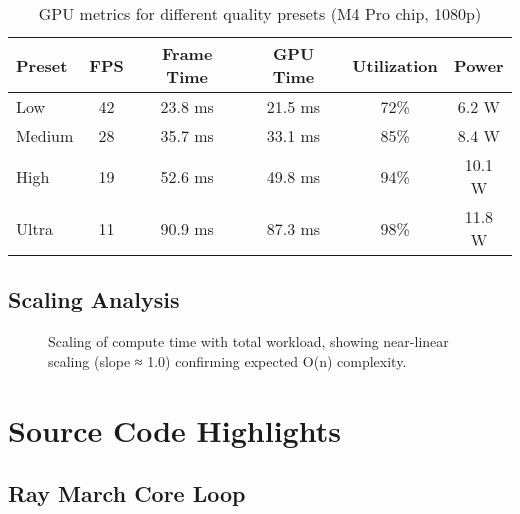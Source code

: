 \documentclass[12pt,a4paper]{article}
\theoremstyle{definition}
\theoremstyle{remark}
\begin{document}
\begin{table}[H]
\centering
\caption{GPU metrics for different quality presets (M4 Pro chip, 1080p)}
\begin{tabular}{lccccc}
\toprule
\textbf{Preset} & \textbf{FPS} & \textbf{Frame Time} & \textbf{GPU Time} & \textbf{Utilization} & \textbf{Power} \\
\midrule
Low & 42 & 23.8 ms & 21.5 ms & 72\% & 6.2 W \\
Medium & 28 & 35.7 ms & 33.1 ms & 85\% & 8.4 W \\
High & 19 & 52.6 ms & 49.8 ms & 94\% & 10.1 W \\
Ultra & 11 & 90.9 ms & 87.3 ms & 98\% & 11.8 W \\
\bottomrule
\end{tabular}
\label{tab:gpu_metrics}
\end{table}

\subsection{Scaling Analysis}

\begin{figure}[H]
    \centering
    \caption{Scaling of compute time with total workload, showing near-linear scaling (slope ≈ 1.0) confirming expected O(n) complexity.}
    \label{fig:scaling_analysis}
\end{figure}

\section{Source Code Highlights}

\subsection{Ray March Core Loop}
\end{document}
